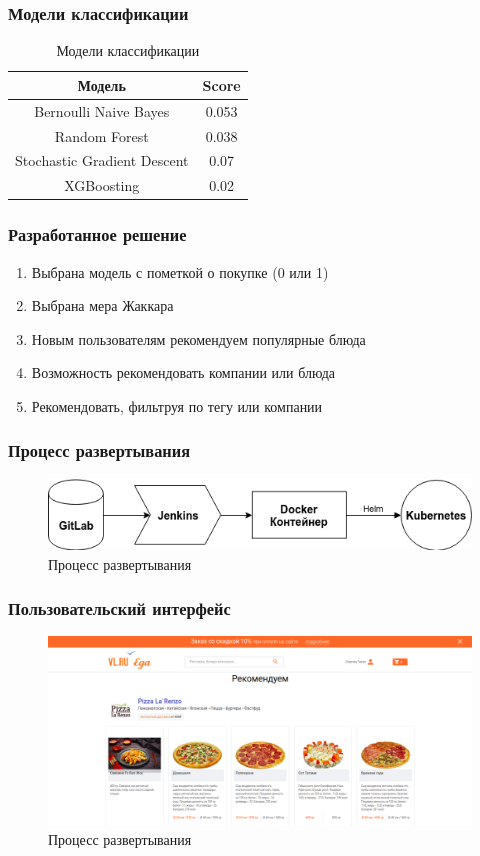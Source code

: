 \documentclass[10pt, unicode]{beamer}
\begin{document}
\begin{frame}
  \frametitle{Модели классификации}
  \begin{table}[H]
    \centering
    \begin{tabular} { | c | c | }
      \hline
      Модель & Score \\
      \hline
      Bernoulli Naive Bayes & 0.053 \\
      Random Forest & 0.038 \\
      Stochastic Gradient Descent & 0.07 \\
      XGBoosting & 0.02 \\
      \hline
    \end{tabular}
    \caption{Модели классификации}
  \end{table}
\end{frame}

\begin{frame}
  \frametitle{Разработанное решение}
  \begin{enumerate}
    \item Выбрана модель с пометкой о покупке (0 или 1)
    \item Выбрана мера Жаккара
    \item Новым пользователям рекомендуем популярные блюда
    \item Возможность рекомендовать компании или блюда
    \item Рекомендовать, фильтруя по тегу или компании
  \end{enumerate}
\end{frame}

\begin{frame}
  \frametitle{Процесс развертывания}
  \begin{figure}[H]
    \centering
    \includegraphics[scale=0.5]{images/deploy.png}
    \caption{Процесс развертывания}
  \end{figure}
\end{frame}

\begin{frame}
  \frametitle{Пользовательский интерфейс}
  \begin{figure}[H]
    \centering
    \includegraphics[scale=0.23]{images/tag_page.png}
    \caption{Процесс развертывания}
  \end{figure}
\end{frame}
\end{document}
